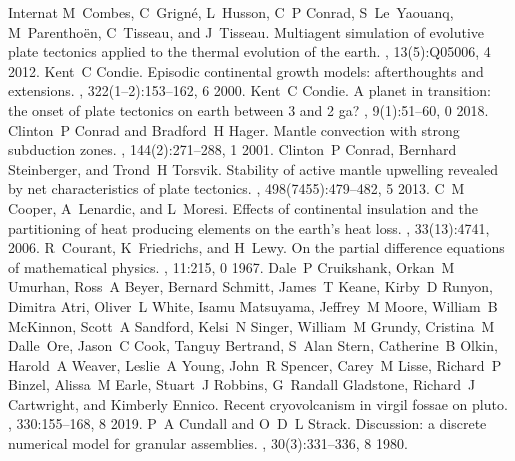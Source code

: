 \documentclass[letterpaper,10pt,english]{jupyterBook}
\begin{document}
\begin{sphinxthebibliography}{Internat}
\sphinxAtStartPar
M Combes, C Grigné, L Husson, C P Conrad, S Le Yaouanq, M Parenthoën, C Tisseau, and J Tisseau. Multiagent simulation of evolutive plate tectonics applied to the thermal evolution of the earth. , 13(5):Q05006, 4 2012.
\sphinxAtStartPar
Kent C Condie. Episodic continental growth models: afterthoughts and extensions. , 322(1–2):153–162, 6 2000.
\sphinxAtStartPar
Kent C Condie. A planet in transition: the onset of plate tectonics on earth between 3 and 2 ga? , 9(1):51–60, 0 2018.
\sphinxAtStartPar
Clinton P Conrad and Bradford H Hager. Mantle convection with strong subduction zones. , 144(2):271–288, 1 2001.
\sphinxAtStartPar
Clinton P Conrad, Bernhard Steinberger, and Trond H Torsvik. Stability of active mantle upwelling revealed by net characteristics of plate tectonics. , 498(7455):479–482, 5 2013.
\sphinxAtStartPar
C M Cooper, A Lenardic, and L Moresi. Effects of continental insulation and the partitioning of heat producing elements on the earth's heat loss. , 33(13):4741, 2006.
\sphinxAtStartPar
R Courant, K Friedrichs, and H Lewy. On the partial difference equations of mathematical physics. , 11:215, 0 1967.
\sphinxAtStartPar
Dale P Cruikshank, Orkan M Umurhan, Ross A Beyer, Bernard Schmitt, James T Keane, Kirby D Runyon, Dimitra Atri, Oliver L White, Isamu Matsuyama, Jeffrey M Moore, William B McKinnon, Scott A Sandford, Kelsi N Singer, William M Grundy, Cristina M Dalle Ore, Jason C Cook, Tanguy Bertrand, S Alan Stern, Catherine B Olkin, Harold A Weaver, Leslie A Young, John R Spencer, Carey M Lisse, Richard P Binzel, Alissa M Earle, Stuart J Robbins, G Randall Gladstone, Richard J Cartwright, and Kimberly Ennico. Recent cryovolcanism in virgil fossae on pluto. , 330:155–168, 8 2019.
\sphinxAtStartPar
P A Cundall and O D L Strack. Discussion: a discrete numerical model for granular assemblies. , 30(3):331–336, 8 1980.

\end{sphinxthebibliography}
\end{document}
